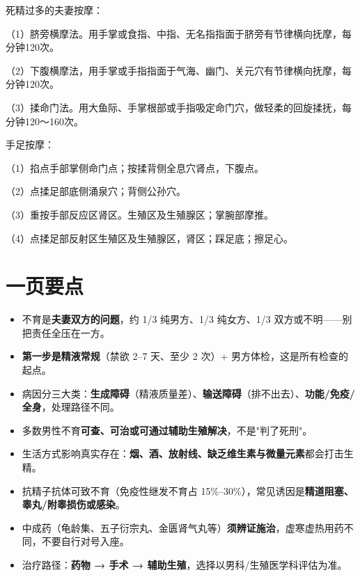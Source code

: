 \documentclass[12pt,UTF8,openany]{ctexbook}
\begin{document}
死精过多的夫妻按摩：

（1）脐旁横摩法。用手掌或食指、中指、无名指指面于脐旁有节律横向抚摩，每分钟120次。

（2）下腹横摩法，用手掌或手指指面于气海、幽门、关元穴有节律横向抚摩，每分钟120次。

（3）揉命门法。用大鱼际、手掌根部或手指吸定命门穴，做轻柔的回旋揉抚，每分钟120～160次。

手足按摩：

（1）掐点手部掌侧命门点；按揉背侧全息穴肾点，下腹点。

（2）点揉足部底侧涌泉穴；背侧公孙穴。

（3）重按手部反应区肾区。生殖区及生殖腺区；掌腕部摩推。

（4）点揉足部反射区生殖区及生殖腺区，肾区；踩足底；擦足心。

\section{一页要点}

\begin{itemize}[leftmargin=2em,itemsep=0.3em]
  \item 不育是\textbf{夫妻双方的问题}，约 1/3 纯男方、1/3 纯女方、1/3 双方或不明——别把责任全压在一方。
  \item \textbf{第一步是精液常规}（禁欲 2–7 天、至少 2 次）+ 男方体检，这是所有检查的起点。
  \item 病因分三大类：\textbf{生成障碍}（精液质量差）、\textbf{输送障碍}（排不出去）、\textbf{功能/免疫/全身}，处理路径不同。
  \item 多数男性不育\textbf{可查、可治或可通过辅助生殖解决}，不是"判了死刑"。
  \item 生活方式影响真实存在：\textbf{烟、酒、放射线、缺乏维生素与微量元素}都会打击生精。
  \item 抗精子抗体可致不育（免疫性继发不育占 15\%–30\%），常见诱因是\textbf{精道阻塞、睾丸/附睾损伤或感染}。
  \item 中成药（龟龄集、五子衍宗丸、金匮肾气丸等）\textbf{须辨证施治}，虚寒虚热用药不同，不要自行对号入座。
  \item 治疗路径：\textbf{药物 → 手术 → 辅助生殖}，选择以男科/生殖医学科评估为准。
\end{itemize}
\end{document}
